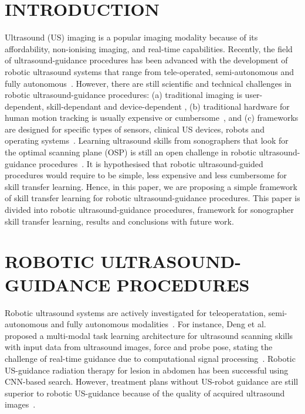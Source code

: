 \documentclass[a4paper, 10pt, conference]{ieeeconf}      %
\begin{document}
\section{INTRODUCTION}
Ultrasound (US) imaging is a popular imaging modality because of its affordability, 
non-ionising imaging, and real-time capabilities.
Recently, the field of ultrasound-guidance procedures has been advanced with the development of robotic ultrasound systems that range from tele-operated, semi-autonomous and fully autonomous~\cite{deng2021, vonHaxthausen2021, Gerlach2022}. 
However, there are still scientific and technical challenges in robotic ultrasound-guidance procedures: 
(a) traditional imaging is user-dependent, skill-dependant and device-dependent \cite{chen1997},
(b) traditional hardware for human motion tracking is usually expensive or cumbersome~\cite{Dressler2021}, and 
(c) frameworks are designed for specific types of sensors, clinical US devices, robots and operating systems~\cite{niu2022}.
Learning ultrasound skills from sonographers that look for the optimal scanning plane (OSP) is still an open challenge in robotic ultrasound-guidance procedures~\cite{deng2021}.
It is hypothesised that robotic ultrasound-guided procedures would require to be simple, less expensive and less cumbersome for skill transfer learning.
Hence, in this paper, we are proposing a simple framework of skill transfer learning for robotic ultrasound-guidance procedures.
This paper is divided into robotic ultrasound-guidance procedures, framework for sonographer skill transfer learning, results and conclusions with future work.

\section{ROBOTIC ULTRASOUND-GUIDANCE PROCEDURES}
Robotic ultrasound systems are actively investigated for teleoperatation, semi-autonomous and fully autonomous modalities~\cite{vonHaxthausen2021}.
For instance, Deng et al. proposed a multi-modal task learning architecture for ultrasound scanning skills with input data from ultrasound images, force and probe pose, stating the challenge of real-time guidance due to computational signal processing~\cite{deng2021}.
Robotic US-guidance radiation therapy for lesion in abdomen has been successful using CNN-based search.
However, treatment plans without US-robot guidance are still superior to robotic US-guidance because of the quality of acquired ultrasound images~\cite{Gerlach2022}.
\end{document}
